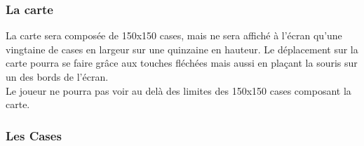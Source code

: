 \documentclass[a4paper]{article}
\newcommand{\alinea}{\hspace*{0.5cm}}
\begin{document}
        \subsubsection{La carte}

          \alinea La carte sera composée de 150x150 cases, mais ne sera affiché à l'écran qu'une vingtaine de cases en largeur sur une quinzaine en hauteur. Le déplacement sur la carte pourra se faire grâce aux touches fléchées mais aussi en plaçant la souris sur un des bords de l'écran.\\
          Le joueur ne pourra pas voir au delà des limites des 150x150 cases composant la carte.

        \subsubsection{Les Cases}
\end{document}
